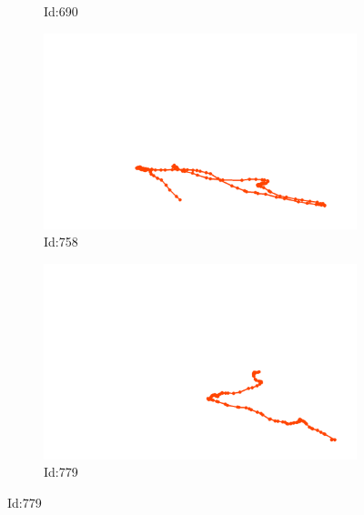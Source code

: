 \documentclass[12pt,twoside]{report}
\begin{document}
\begin{figure}
\begin{subfigure}[b]{0.20\textwidth}
\caption{Id:690}
\end{subfigure}
\begin{subfigure}[b]{0.20\textwidth}
\centering
\includegraphics[width=\textwidth]{../trajectories/758.png}
\caption{Id:758}
\end{subfigure}
\begin{subfigure}[b]{0.20\textwidth}
\centering
\includegraphics[width=\textwidth]{../trajectories/779.png}
\caption{Id:779}
\end{subfigure}
\end{figure}
\end{document}
